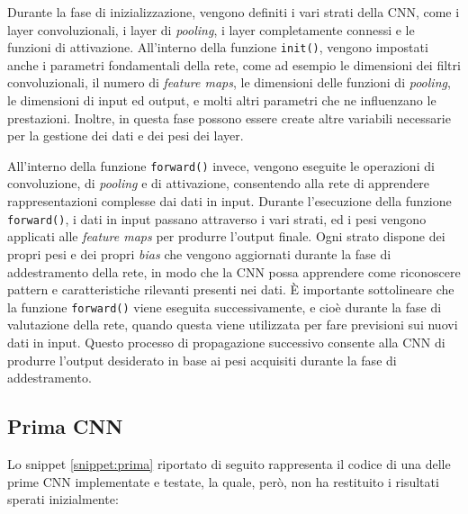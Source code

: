 \documentclass[12pt,italian]{report}
\begin{document}
	Durante la fase di inizializzazione, vengono definiti i vari strati della CNN, come i layer convoluzionali, i layer di \textit{pooling}, i layer completamente connessi e le funzioni di attivazione. All'interno della funzione \texttt{init()}, vengono impostati anche i parametri fondamentali della rete, come ad esempio le dimensioni dei filtri convoluzionali, il numero di \textit{feature maps}, le dimensioni delle funzioni di \textit{pooling}, le dimensioni di input ed output, e molti altri parametri che ne influenzano le prestazioni. Inoltre, in questa fase possono essere create altre variabili necessarie per la gestione dei dati e dei pesi dei layer.
	
	All'interno della funzione \texttt{forward()} invece, vengono eseguite le operazioni di convoluzione, di \textit{pooling} e di attivazione, consentendo alla rete di apprendere rappresentazioni complesse dai dati in input. Durante l'esecuzione della funzione \texttt{forward()}, i dati in input passano attraverso i vari strati, ed i pesi vengono applicati alle \textit{feature maps} per produrre l'output finale. Ogni strato dispone dei propri pesi e dei propri \textit{bias} che vengono aggiornati durante la fase di addestramento della rete, in modo che la CNN possa apprendere come riconoscere pattern e caratteristiche rilevanti presenti nei dati. È importante sottolineare che la funzione \texttt{forward()} viene eseguita successivamente, e cioè durante la fase di valutazione della rete, quando questa viene utilizzata per fare previsioni sui nuovi dati in input. Questo processo di propagazione successivo consente alla CNN di produrre l'output desiderato in base ai pesi acquisiti durante la fase di addestramento.
	
	
	\subsection{Prima CNN}
	\label{subsec:prima}
	
	Lo snippet \ref{snippet:prima} riportato di seguito rappresenta il codice di una delle prime CNN implementate e testate, la quale, però, non ha restituito i risultati sperati inizialmente:
	
\end{document}
